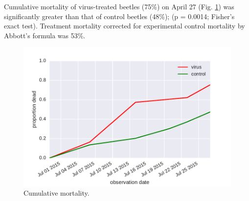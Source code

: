 \documentclass[letterpaper,11pt]{scrartcl}
\begin{document}
Cumulative mortality of virus-treated beetles (75\%) on April 27 (Fig. \ref{mortality}) was significantly greater than that of 
control beetles (48\%); (p = 0.0014; Fisher's exact test). Treatment mortality corrected for experimental control mortality by Abbott's 
formula was 53\%.

 
\begin{figure}
\centering
\includegraphics[width = \textwidth]{wb2_mortality.pdf}
\caption{Cumulative mortality.}
\label{mortality}
\end{figure} 
 
 
%
%
\end{document}
